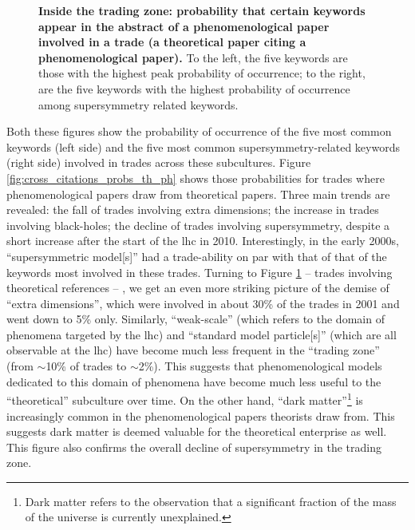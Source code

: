 \documentclass[smallextended]{svjour3}
\begin{document}
\begin{figure}
    \centering
    
    \caption{\textbf{Inside the trading zone: probability that certain keywords appear in the abstract of a phenomenological paper involved in a trade (a theoretical paper citing a phenomenological paper).} To the left, the five keywords are those with the highest peak probability of occurrence; to the right, are the five keywords with the highest probability of occurrence among supersymmetry related keywords.} 
    \label{fig:cross_citations_probs_ph_th}
\end{figure}

Both these figures show the probability of occurrence of the five most common keywords (left side) and the five most common supersymmetry-related keywords (right side) involved in trades across these subcultures. Figure \ref{fig:cross_citations_probs_th_ph} shows those probabilities for trades where phenomenological papers draw from theoretical papers. Three main trends are revealed: the fall of trades involving extra dimensions; the increase in trades involving black-holes; the decline of trades involving supersymmetry, despite a short increase after the start of the \gls{lhc} in 2010. Interestingly, in the early 2000s, ``supersymmetric model[s]'' had a trade-ability on par with that of that of the keywords most involved in these trades. Turning to Figure \ref{fig:cross_citations_probs_ph_th} -- trades involving theoretical references -- , we get an even more striking picture of the demise of ``extra dimensions'', which were involved in about 30\% of the trades in 2001 and went down to 5\% only. Similarly, ``weak-scale''  (which refers to the domain of phenomena targeted by the \gls{lhc}) and ``standard model particle[s]'' (which are all observable at the \gls{lhc}) have become much less frequent in the ``trading zone'' (from $\sim$10\% of trades to $\sim$2\%). This suggests that phenomenological models dedicated to this domain of phenomena have become much less useful to the ``theoretical'' subculture over time. On the other hand, ``dark matter''\footnote{Dark matter refers to the observation that a significant fraction of the mass of the universe is currently unexplained.} is increasingly common in the phenomenological papers theorists draw from. This suggests dark matter is deemed valuable for the theoretical enterprise as well. This figure also confirms the overall decline of supersymmetry in the trading zone.
\end{document}
